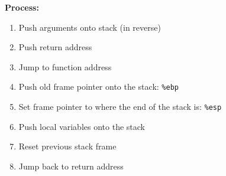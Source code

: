\documentclass{article}
\begin{document}
\textbf{Process:}
\begin{enumerate}
\item
  Push arguments onto stack (in reverse)
\item
  Push return address
\item
  Jump to function address
\item
  Push old frame pointer onto the stack: \texttt{\%ebp}
\item
  Set frame pointer to where the end of the stack is: \texttt{\%esp}
\item
  Push local variables onto the stack
\item
  Reset previous stack frame
\item
  Jump back to return address

\end{enumerate}
\end{document}
